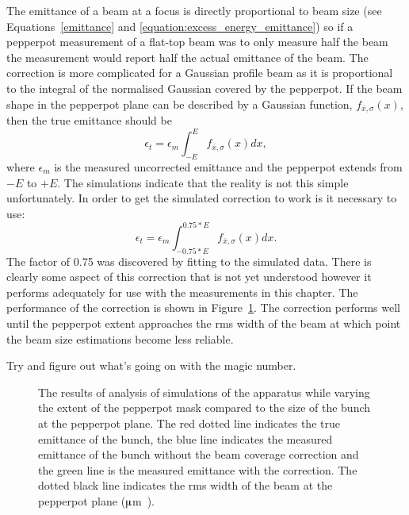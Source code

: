 The emittance of a beam at a focus is directly proportional to beam size (see Equations~\ref{emittance} and \ref{equation:excess_energy_emittance}) so if a pepperpot measurement of a flat-top beam was to only measure half the beam the measurement would report half the actual emittance of the beam.
The correction is more complicated for a Gaussian profile beam as it is proportional to the integral of the normalised Gaussian covered by the pepperpot.
If the beam shape in the pepperpot plane can be described by a Gaussian function, $f_{\bar{x},\sigma}(x)$, then the true emittance should be
\begin{equation}
\epsilon_t = \epsilon_m \int_{-E}^{E} f_{\bar{x}, \sigma}(x) dx,
\end{equation}
where $\epsilon_m$ is the measured uncorrected emittance and the pepperpot extends from $-E$ to $+E$.
The simulations indicate that the reality is not this simple unfortunately. In order to get the simulated correction to work is it necessary to use:
\begin{equation}
\epsilon_t = \epsilon_m \int_{-0.75*E}^{0.75*E} f_{\bar{x}, \sigma}(x) dx.
\end{equation}
The factor of 0.75 was discovered by fitting to the simulated data.
There is clearly some aspect of this correction that is not yet understood however it performs adequately for use with the measurements in this chapter.
The performance of the correction is shown in Figure~\ref{figure:pepperpot_extent}.
The correction performs well until the pepperpot extent approaches the \gls{rms} width of the beam at which point the beam size estimations become less reliable.

{\color{red}
Try and figure out what's going on with the magic number.
}

\begin{figure}
    \center
    
    \caption{The results of analysis of simulations of the apparatus while varying the extent of the pepperpot mask compared to the size of the bunch at the pepperpot plane.
    The red dotted line indicates the true emittance of the bunch, the blue line indicates the measured emittance of the bunch without the beam coverage correction and the green line is the measured emittance with the correction.
    The dotted black line indicates the \gls{rms} width of the beam at the pepperpot plane (\unit[873]{$\muup$m}).}
    \label{figure:pepperpot_extent}
\end{figure}

